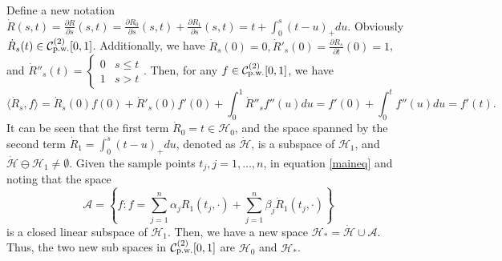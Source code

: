 Define a new notation $\dot{R}(s,t)=\frac{\partial R}{\partial s}(s,t)=\frac{\partial R_0}{\partial s}(s,t)+\frac{\partial R_1}{\partial s}(s,t)=t+\int_0^s(t-u)_+du$. Obviously $\dot{R}_s(t) \in \mathcal{C}_{\mbox{\scriptsize p.w.}}^{(2)}[0,1]$. Additionally, we have $\dot{R}_s(0)=0, \dot{R}'_s(0)=\frac{\partial \dot{R}_s}{\partial t}(0)=1$, and $ \dot{R}''_s(t)=\begin{cases}
0 & s\leq t \\ 1 & s>t \end{cases}$. Then, for any $f\in \mathcal{C}_{\mbox{\scriptsize p.w.}}^{(2)}[0,1]$, we have 
\begin{equation}
\langle \dot{R}_s,f\rangle =\dot{R}_s(0)f(0)+\dot{R}'_s(0)f'(0)+\int_0^1\dot{R}''_s f''	(u) du=f'(0)+\int_0^t f''(u)du=f'(t).
\end{equation}
%
It can be seen that the first term $\dot{R}_0=t\in \mathcal{H}_0$, and the space spanned by the second term $\dot{R}_1=\int_0^s(t-u)_+du$, denoted as $\mathcal{\dot{H}}$, is a subspace of $\mathcal{H}_1$, and $\mathcal{\dot{H}} \ominus \mathcal{H}_1\neq \emptyset$. Given the sample points $t_j, j=1, \ldots, n$, in equation \eqref{maineq} and noting that the space
\begin{equation}
\mathcal{A}=\left\lbrace f: f=\sum_{j=1}^{n}\alpha_jR_1(t_j,\cdot)+\sum_{j=1}^{n}\beta_j\dot{R}_1(t_j,\cdot)\right\rbrace 
\end{equation}
is a closed linear subspace of $\mathcal{H}_1$. Then, we have a new space $\mathcal{H}_*=\mathcal{\dot{H}} \cup \mathcal{A}$. Thus, the two new sub spaces in $\mathcal{C}_{\mbox{\scriptsize p.w.}}^{(2)}[0,1]$ are $\mathcal{H}_0$ and $\mathcal{H}_*$.


